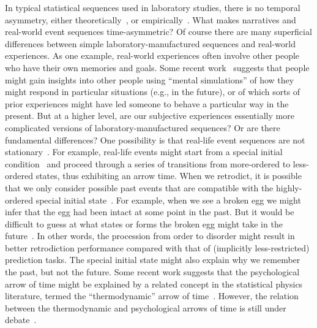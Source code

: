 \documentclass[10pt]{article}
\begin{document}
In typical statistical sequences used in laboratory studies, there is no temporal asymmetry, either theoretically~\citep{Cove94, BialEtal01, ElliEtal09}, or empirically~\citep{JonePash07}. What makes narratives and real-world event sequences time-asymmetric? Of course there are many superficial differences between simple laboratory-manufactured sequences and real-world experiences. As one example, real-world experiences often involve other people who have their own memories and goals. Some recent work~\citep[e.g.,][]{TamiMitc13, MeyeEtal19b} suggests that people might gain insights into other people using ``mental simulations'' of how they might respond in particular situations (e.g., in the future), or of which sorts of prior experiences might have led someone to behave a particular way in the present.  But at a higher level, are our subjective experiences essentially more complicated versions of laboratory-manufactured sequences? Or are there fundamental differences? One possibility is that real-life event sequences are not stationary~\citep[i.e., not in equilibrium; ][]{Cove94}. For example, real-life events might start from a special initial condition~\citep{Albe00, Feyn65, Cove94} and proceed through a series of transitions from more-ordered to less-ordered states, thus exhibiting an arrow time. When we retrodict, it is possible that we only consider possible past events that are compatible with the highly-ordered special initial state~\citep{Carr10, Carr16}. For example, when we see a broken egg we might infer that the egg had been intact at some point in the past. But it would be difficult to guess at what states or forms the broken egg might take in the future~\citep{Carr10, Carr16}. In other words, the procession from order to disorder might result in better retrodiction performance compared with that of (implicitly less-restricted) prediction tasks. The special initial state might also explain why we remember the past, but not the future. Some recent work suggests that the psychological arrow of time might be explained by a related concept in the statistical physics literature, termed the ``thermodynamic'' arrow of time~\citep{MlodBrun14, Rove22}. However, the relation between the thermodynamic and psychological arrows of time is still under debate~\citep{Golo21, HemmShen19}.
\end{document}
